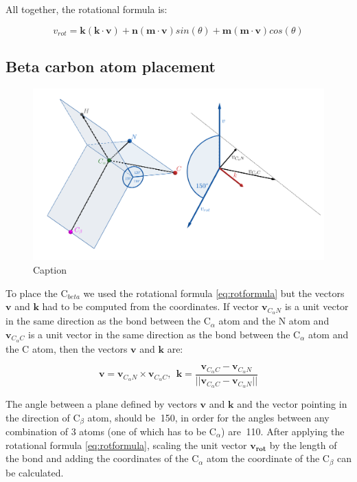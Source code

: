 All together, the rotational formula is:

\begin{equation}
    v_{rot} = \bm{k}(\bm{k} \cdot \bm{v}) + \bm{n} (\bm{m} \cdot \bm{v}) sin(\theta) + \bm{m} (\bm{m} \cdot \bm{v}) cos(\theta)
    \label{eq:rotformula}
\end{equation}

\subsection{Beta carbon atom placement}

\begin{figure}
    \centering
    \includegraphics[width=\linewidth]{imgs_tomas/cbeta.png}
    \caption{Caption}
    \label{fig:cbeta}
\end{figure}

To place the C$_{beta}$ we used the rotational formula \ref{eq:rotformula} but the vectors $\bm{v}$ and $\bm{k}$ had to be computed from the coordinates. If vector $\bm{v}_{C_\alpha N}$ is a unit vector in the same direction as the bond between the C$_\alpha$ atom and the N atom and $\bm{v}_{C_\alpha C}$ is a unit vector in the same direction as the bond between the C$_\alpha$ atom and the C atom, then the vectors $\bm{v}$ and $\bm{k}$ are:

$$\bm{v} = \bm{v}_{C_\alpha N} \times  \bm{v}_{C_\alpha C}, ~~ \bm{k} = \frac{\bm{v}_{C_\alpha C} -  \bm{v}_{C_\alpha N}}{||\bm{v}_{C_\alpha C} -  \bm{v}_{C_\alpha N}||}$$

The angle between a plane defined by vectors $\bm{v}$ and $\bm{k}$ and the vector pointing in the direction of C$_\beta$ atom, should be $~$150\degree, in order for the angles between any combination of 3 atoms (one of which has to be C$_\alpha$) are $~$110\degree.
After applying the rotational formula \ref{eq:rotformula}, scaling the unit vector $\bm{v_{rot}}$ by the length of the bond and adding the coordinates of the C$_\alpha$ atom the coordinate of the C$_\beta$ can be calculated.

